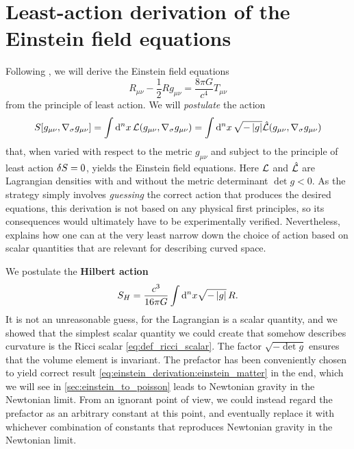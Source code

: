 \section{Least-action derivation of the Einstein field equations}
\label{sec:einstein_derivation}

Following \cite[section 4.3]{ref:carroll}, we will derive the Einstein field equations
\begin{equation}
	R_{\mu \nu} - \frac{1}{2} R g_{\mu \nu} = \frac{8 \pi G}{c^4} T_{\mu \nu}
\end{equation}
from the principle of least action.
We will \emph{postulate} the action
\begin{equation}
	S[g_{\mu \nu}, \nabla_\sigma g_{\mu \nu}] = \int \mathop{}\!\mathrm{d}^n x \, \mathcal{L}(g_{\mu \nu}, \nabla_\sigma g_{\mu \nu})
	                                          = \int \mathop{}\!\mathrm{d}^n x \, \sqrt{-\left\lvert g \right\rvert} \hat{\mathcal{L}}(g_{\mu \nu}, \nabla_\sigma g_{\mu \nu})
\end{equation}
that, when varied with respect to the metric $g_{\mu \nu}$ and subject to the principle of least action $\delta S = 0$, yields the Einstein field equations.
Here $\mathcal{L}$ and $\hat{\mathcal{L}}$ are Lagrangian densities with and without the metric determinant $\det{g} < 0$.
As the strategy simply involves \emph{guessing} the correct action that produces the desired equations, this derivation is not based on any physical first principles, so its consequences would ultimately have to be experimentally verified.
Nevertheless, \cite[page 160-161]{ref:carroll} explains how one can at the very least narrow down the choice of action based on scalar quantities that are relevant for describing curved space.

We postulate the \textbf{Hilbert action}
\begin{equation}
	S_H = \frac{c^3}{16 \pi G} \int \mathop{}\!\mathrm{d}^n x \sqrt{-\left\lvert g \right\rvert} \, R .
	\label{eq:einstein_derivation:hilbert_action}
\end{equation}
It is not an unreasonable guess, for the Lagrangian is a scalar quantity, and we showed that the simplest scalar quantity we could create that somehow describes curvature is the Ricci scalar \eqref{eq:def_ricci_scalar}.
The factor $\sqrt{-\det{g}}$ ensures that the volume element is invariant.
The prefactor has been conveniently chosen to yield correct result \eqref{eq:einstein_derivation:einstein_matter} in the end, which we will see in \cref{sec:einstein_to_poisson} leads to Newtonian gravity in the Newtonian limit.
From an ignorant point of view, we could instead regard the prefactor as an arbitrary constant at this point, and eventually replace it with whichever combination of constants that reproduces Newtonian gravity in the Newtonian limit.


